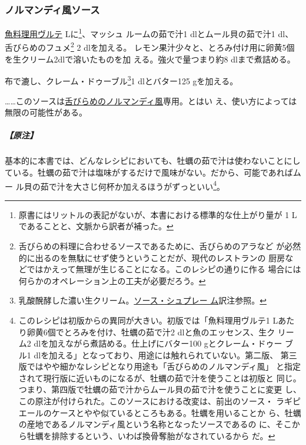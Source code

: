 \begin{recette}
\maeaki

\hypertarget{sauce-normande}{%
\subsubsection{ノルマンディ風ソース}\label{sauce-normande}}



\protect\hyperlink{veloute-de-poisson}{魚料理用ヴルテ}\troisquarts{}
Lに\footnote{原書にはリットルの表記がないが、本書における標準的な仕上がり量が
  1 Lであることと、文脈から訳者が補った。}、マッシュ ルームの茹で汁1
dlとムール貝の茹で汁1 dl、舌びらめのフュメ\footnote{舌びらめの料理に合わせるソースであるために、舌びらめのアラなど
  が必然的に出るのを無駄にせず使うということだが、現代のレストランの
  厨房などではかえって無理が生じることになる。このレシピの通りに作る
  場合には何らかのオペレーション上の工夫が必要だろう。} 2 dlを加える。
レモン果汁少々と、とろみ付け用に卵黄5個を生クリーム2dlで溶いたものを加
える。強火で\deuxtiers{}量つまり約8 dlまで煮詰める。

布で漉し、クレーム・ドゥーブル\footnote{乳酸醗酵した濃い生クリーム。\protect\hyperlink{sauce-supreme}{ソース・シュプレー
  ム}訳注参照。}1 dlとバター125 gを加える。

\ldots{}\ldots{}このソースは\protect\hyperlink{sole-normande}{舌びらめのノルマンディ風}専用。とはい
え、使い方によっては無限の可能性がある。

\hypertarget{nota-sauce-normande}{%
\subparagraph{【原注】}\label{nota-sauce-normande}}

基本的に本書では、どんなレシピにおいても、牡蠣の茹で汁は使わないことにし
ている。牡蠣の茹で汁は塩味がするだけで風味がない。だから、可能であればムー
ル貝の茹で汁を大さじ何杯か加えるほうがずっといい\footnote{このレシピは初版からの異同が大きい。初版では「魚料理用ヴルテ1
  Lあたり卵黄6個でとろみを付け、牡蠣の茹で汁2 dlと魚のエッセンス、生ク
  リーム2 dlを加えながら煮詰める。仕上げにバター100 gとクレーム・ドゥー
  ブル1 dlを加える」となっており、用途には触れられていない。第二版、
  第三版ではやや細かなレシピとなり用途も「舌びらめのノルマンディ風」
  と指定されて現行版に近いものになるが、牡蠣の茹で汁を使うことは初版と
  同じ。つまり、第四版で牡蠣の茹で汁からムール貝の茹で汁を使うことに変更
  し、この原注が付けられた。このソースにおける改変は、前出のソース・
  ラギピエールのケースとやや似ているところもある。牡蠣を用いることか
  ら、牡蠣の産地であるノルマンディ風という名称となったソースであるの
  に、そこから牡蠣を排除するという、いわば換骨奪胎がなされているから
  だ。}。


\end{recette}

